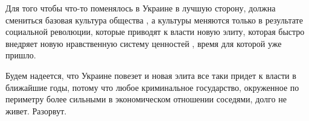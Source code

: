 Для того чтобы что-то  поменялось  в Украине в лучшую сторону, должна смениться
базовая культура общества , а культуры меняются только в результате социальной
революции, которые приводят к власти  новую элиту, которая быстро внедряет
новую нравственную систему ценностей , время для которой уже пришло.

Будем надеется, что Украине повезет и новая элита все таки придет к власти в
ближайшие годы,  потому что любое  криминальное  государство, окруженное  по
периметру более сильными в экономическом  отношении соседями, долго не живет.
Разорвут.

